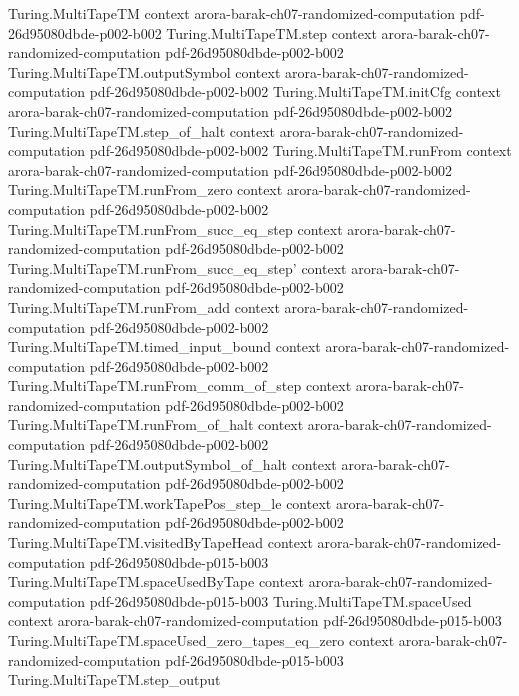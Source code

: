 \begin{theorem}
\proofstep
  {Turing.MultiTapeTM}
  {context}
  {arora-barak-ch07-randomized-computation}
  {pdf-26d95080dbde-p002-b002}
\proofstep
  {Turing.MultiTapeTM.step}
  {context}
  {arora-barak-ch07-randomized-computation}
  {pdf-26d95080dbde-p002-b002}
\proofstep
  {Turing.MultiTapeTM.outputSymbol}
  {context}
  {arora-barak-ch07-randomized-computation}
  {pdf-26d95080dbde-p002-b002}
\proofstep
  {Turing.MultiTapeTM.initCfg}
  {context}
  {arora-barak-ch07-randomized-computation}
  {pdf-26d95080dbde-p002-b002}
\proofstep
  {Turing.MultiTapeTM.step_of_halt}
  {context}
  {arora-barak-ch07-randomized-computation}
  {pdf-26d95080dbde-p002-b002}
\proofstep
  {Turing.MultiTapeTM.runFrom}
  {context}
  {arora-barak-ch07-randomized-computation}
  {pdf-26d95080dbde-p002-b002}
\proofstep
  {Turing.MultiTapeTM.runFrom_zero}
  {context}
  {arora-barak-ch07-randomized-computation}
  {pdf-26d95080dbde-p002-b002}
\proofstep
  {Turing.MultiTapeTM.runFrom_succ_eq_step}
  {context}
  {arora-barak-ch07-randomized-computation}
  {pdf-26d95080dbde-p002-b002}
\proofstep
  {Turing.MultiTapeTM.runFrom_succ_eq_step'}
  {context}
  {arora-barak-ch07-randomized-computation}
  {pdf-26d95080dbde-p002-b002}
\proofstep
  {Turing.MultiTapeTM.runFrom_add}
  {context}
  {arora-barak-ch07-randomized-computation}
  {pdf-26d95080dbde-p002-b002}
\proofstep
  {Turing.MultiTapeTM.timed_input_bound}
  {context}
  {arora-barak-ch07-randomized-computation}
  {pdf-26d95080dbde-p002-b002}
\proofstep
  {Turing.MultiTapeTM.runFrom_comm_of_step}
  {context}
  {arora-barak-ch07-randomized-computation}
  {pdf-26d95080dbde-p002-b002}
\proofstep
  {Turing.MultiTapeTM.runFrom_of_halt}
  {context}
  {arora-barak-ch07-randomized-computation}
  {pdf-26d95080dbde-p002-b002}
\proofstep
  {Turing.MultiTapeTM.outputSymbol_of_halt}
  {context}
  {arora-barak-ch07-randomized-computation}
  {pdf-26d95080dbde-p002-b002}
\proofstep
  {Turing.MultiTapeTM.workTapePos_step_le}
  {context}
  {arora-barak-ch07-randomized-computation}
  {pdf-26d95080dbde-p002-b002}
\proofstep
  {Turing.MultiTapeTM.visitedByTapeHead}
  {context}
  {arora-barak-ch07-randomized-computation}
  {pdf-26d95080dbde-p015-b003}
\proofstep
  {Turing.MultiTapeTM.spaceUsedByTape}
  {context}
  {arora-barak-ch07-randomized-computation}
  {pdf-26d95080dbde-p015-b003}
\proofstep
  {Turing.MultiTapeTM.spaceUsed}
  {context}
  {arora-barak-ch07-randomized-computation}
  {pdf-26d95080dbde-p015-b003}
\proofstep
  {Turing.MultiTapeTM.spaceUsed_zero_tapes_eq_zero}
  {context}
  {arora-barak-ch07-randomized-computation}
  {pdf-26d95080dbde-p015-b003}
\proofstep
  {Turing.MultiTapeTM.step_output}

\end{theorem}
